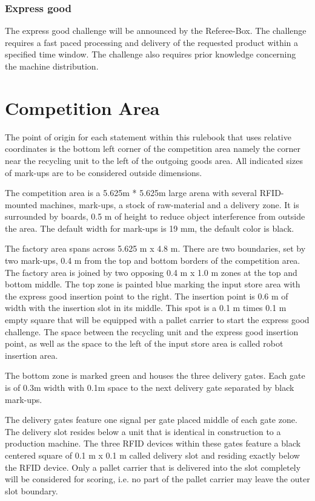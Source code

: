 \documentclass[12pt,twoside]{article}
\begin{document}
\subsubsection{Express good}

The express good challenge will be announced by the Referee-Box. The challenge
requires a fast paced processing and delivery of the requested product within
a specified time window. The challenge also requires prior knowledge
concerning the machine distribution.

\section{Competition Area}

The point of origin for each statement within this rulebook that uses
relative coordinates is the bottom left corner of the competition area
namely the corner near the recycling unit to the left of the outgoing
goods area. All indicated sizes of mark-ups are to be considered
outside dimensions.

The competition area is a 5.625m * 5.625m large arena with several
RFID-mounted machines, mark-ups, a stock of raw-material and a
delivery zone. It is surrounded by boards, 0.5 m of height to reduce
object interference from outside the area. The default width for
mark-ups is 19 mm, the default color is black.

The factory area spans across 5.625 m x 4.8 m. There are two
boundaries, set by two mark-ups, 0.4 m from the top and bottom borders
of the competition area. The factory area is joined by two opposing
0.4 m x 1.0 m zones at the top and bottom middle. The top zone is
painted blue marking the input store area with the express good
insertion point to the right. The insertion point is 0.6 m of width
with the insertion slot in its middle. This spot is a 0.1 m times 0.1
m empty square that will be equipped with a pallet carrier to start
the express good challenge. The space between the recycling unit and
the express good insertion point, as well as the space to the left of
the input store area is called robot insertion area.

The bottom zone is marked green and houses the three delivery gates.
Each gate is of 0.3m width with 0.1m space to the next delivery gate
separated by black mark-ups.

The delivery gates feature one signal per gate placed middle of each
gate zone. The delivery slot resides below a unit that is identical in
construction to a production machine. The three RFID devices within
these gates feature a black centered square of 0.1 m x 0.1 m called
delivery slot and residing exactly below the RFID device. Only a
pallet carrier that is delivered into the slot completely will be
considered for scoring, i.e. no part of the pallet carrier may leave
the outer slot boundary.
\end{document}
